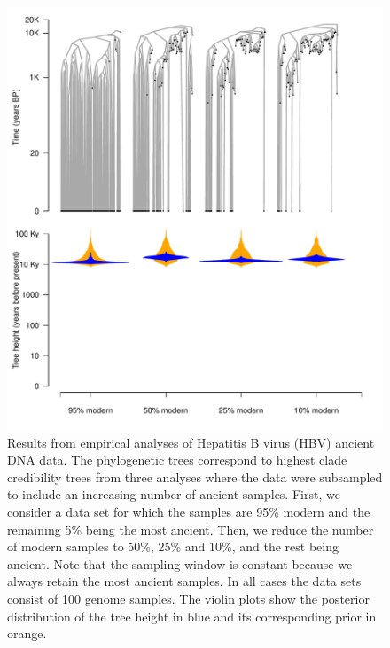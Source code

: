\documentclass[11pt]{article}
\begin{document}
\begin{figure}[H]
    \begin{center}
        \includegraphics[scale=0.7, angle=0]{empirical_results_biased_root_height.pdf}
        \caption{Results from empirical analyses of Hepatitis B virus (HBV) ancient DNA data. The phylogenetic trees correspond to highest clade credibility trees from three analyses where the data were subsampled to include an increasing number of ancient samples. First, we consider a data set for which the samples are 95\% modern and the remaining 5\% being the most ancient. Then, we reduce the number of modern samples to 50\%, 25\% and 10\%, and the rest being ancient. Note that the sampling window is constant because we always retain the most ancient samples. In all cases the data sets consist of 100 genome samples. The violin plots show the posterior distribution of the tree height in blue and its corresponding prior in orange.}
        \label{figure:Fig7}
    \end{center}
\end{figure}
\end{document}
